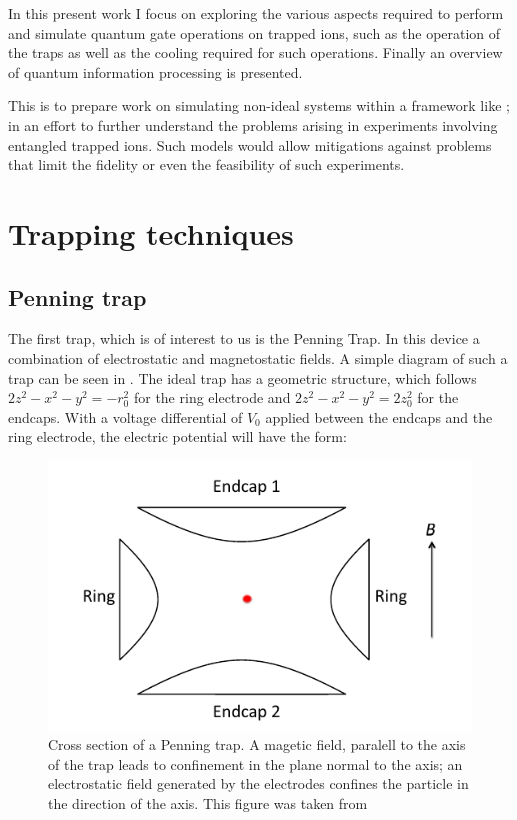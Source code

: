 \documentclass[12pt,twoside]{article}
\begin{document}
In this present work I focus on exploring the various aspects required to perform and simulate quantum gate operations on trapped ions, such as the operation of the traps as well as the cooling required for such operations. Finally an overview of quantum information processing is presented.

This is to prepare work on simulating non-ideal systems within a framework like \cite{QuTip1,QuTip2}; in an effort to further understand the problems arising in experiments involving entangled trapped ions. Such models would allow mitigations against problems that limit the fidelity or even the feasibility of such experiments.

\section{Trapping techniques}
\label{Trap}

\subsection{Penning trap}
\label{Trap:Penning}

The first trap, which is of interest to us is the Penning Trap. In this device a combination of electrostatic and magnetostatic fields. A simple diagram of such a trap can be seen in . The ideal trap has a geometric structure, which follows $2z^2 -x^2 -y^2 = -r_0^2$ for the ring electrode and $2z^2 -x^2 -y^2 = 2z_0^2$ for the endcaps\cite{Charged_Particle_traps_Penning}. With a voltage differential of $V_0$ applied between the endcaps and the ring electrode, the electric potential will have the form\cite{Charged_Particle_traps_Penning,Penning_traps}:


\begin{figure}[!b]
	\centering
	\includegraphics[width=0.5\linewidth]{Penning_trap}
	\caption[Diagram of a Penning trap]{Cross section of a Penning trap. A magetic field, paralell to the axis of the trap leads to confinement in the plane normal to the axis; an electrostatic field generated by the electrodes confines the particle in the direction of the axis. This figure was taken from \cite{Penning_traps}}
	\label{Fig:Penning}
\end{figure}
\end{document}
